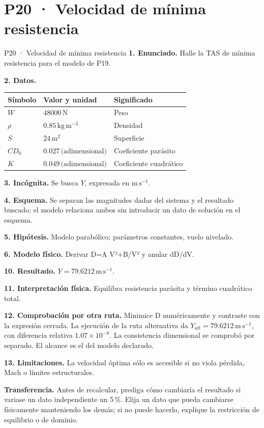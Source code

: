 \chapter*{P20 · Velocidad de mínima resistencia}
\begin{studiumworked}{P20 · Velocidad de mínima resistencia}
\textbf{1. Enunciado.} Halle la TAS de mínima resistencia para el modelo de P19.

\textbf{2. Datos.}
\begin{longtable}{p{.16\linewidth}p{.35\linewidth}p{.38\linewidth}}\toprule Símbolo & Valor y unidad & Significado\\\midrule\endhead
$W$ & $48000\,\mathrm N$ & Peso\\
$\rho$ & $0.85\,\mathrm{kg\,m^{-3}}$ & Densidad\\
$S$ & $24\,\mathrm{m^2}$ & Superficie\\
$CD_{0}$ & $0.027\,\text{(adimensional)}$ & Coeficiente parásito\\
$K$ & $0.049\,\text{(adimensional)}$ & Coeficiente cuadrático\\
\bottomrule\end{longtable}
\textbf{3. Incógnita.} Se busca $Y$, expresada en $\mathrm{m\,s^{-1}}$.

\textbf{4. Esquema.} Se separan las magnitudes dadas del sistema y el resultado buscado; el modelo relaciona ambos sin introducir un dato de solución en el esquema.

\textbf{5. Hipótesis.} Modelo parabólico; parámetros constantes, vuelo nivelado.

\textbf{6. Modelo físico.} Derivar D=A V²+B/V² y anular dD/dV.


\textbf{10. Resultado.} $Y=79.6212\,\mathrm{m\,s^{-1}}$.

\textbf{11. Interpretación física.} Equilibra resistencia parásita y término cuadrático total.

\textbf{12. Comprobación por otra ruta.} Minimice D numéricamente y contraste con la expresión cerrada. La ejecución de la ruta alternativa da $Y_{alt}=79.6212\,\mathrm{m\,s^{-1}}$, con diferencia relativa $1.07\times10^{-8}$. La consistencia dimensional se comprobó por separado. El alcance es el del modelo declarado.

\textbf{13. Limitaciones.} La velocidad óptima sólo es accesible si no viola pérdida, Mach o límites estructurales.

\textbf{Transferencia.} Antes de recalcular, prediga cómo cambiaría el resultado si variase un dato independiente un 5\,\%. Elija un dato que pueda cambiarse físicamente manteniendo los demás; si no puede hacerlo, explique la restricción de equilibrio o de dominio.\par
\end{studiumworked}
